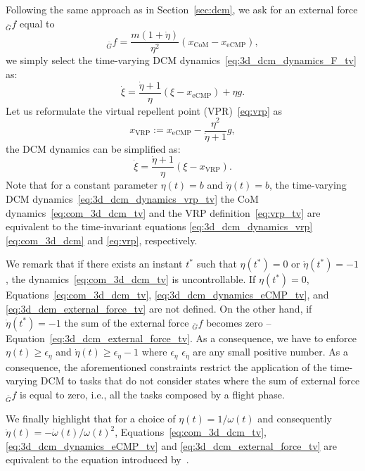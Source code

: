 Following the same approach as in Section~\ref{sec:dcm}, we ask for an external force ${}_{\bar{G}} f$ equal to
\begin{equation}
    \label{eq:3d_dcm_external_force_tv}
    {}_{\bar{G}} f = \frac{m(1 + \dot{\eta})}{\eta^2} (x_\text{CoM} - x_\text{eCMP}),
\end{equation}
we simply select the time-varying DCM dynamics~\eqref{eq:3d_dcm_dynamics_F_tv} as:
\begin{equation}
  \label{eq:3d_dcm_dynamics_eCMP_tv}
  \dot{\xi} = \frac{\dot{\eta} + 1}{\eta}( \xi - x_\text{eCMP}) +  \eta g.
\end{equation}
Let us reformulate the virtual repellent point (VPR)~\eqref{eq:vrp} as 
\begin{equation}
\label{eq:vrp_tv}
x_\text{VRP} := x_\text{eCMP} - \frac{\eta^2}{\dot{\eta} + 1} g,
\end{equation}
the DCM dynamics can be simplified as:
\begin{equation}
  \label{eq:3d_dcm_dynamics_vrp_tv}
   \dot{\xi} = \frac{\dot{\eta} + 1}{\eta}( \xi - x_\text{VRP}).
\end{equation}
Note that for a constant parameter $\eta(t) = b$ and $\dot{\eta}(t) = b$, the time-varying DCM dynamics~\eqref{eq:3d_dcm_dynamics_vrp_tv} the CoM dynamics~\eqref{eq:com_3d_dcm_tv} and the VRP definition~\eqref{eq:vrp_tv} are equivalent to the time-invariant equations \eqref{eq:3d_dcm_dynamics_vrp} \eqref{eq:com_3d_dcm} and \eqref{eq:vrp}, respectively. 
\par
We remark that if there exists an instant $t^*$ such that $\eta(t^*) = 0$ or $\dot{\eta}(t^*) = -1$, the dynamics~\eqref{eq:com_3d_dcm_tv} is uncontrollable. If $\eta(t^*) = 0$, Equations~\eqref{eq:com_3d_dcm_tv}, \eqref{eq:3d_dcm_dynamics_eCMP_tv}, and \eqref{eq:3d_dcm_external_force_tv} are not defined. On the other hand, if $\dot{\eta}(t^*) = -1$ the sum of the external force ${}_{\bar{G}} f$ becomes zero -- Equation~\eqref{eq:3d_dcm_external_force_tv}.
As a consequence, we have to enforce $\eta(t) \ge \epsilon_{\eta}$ and $\dot{\eta}(t) \ge \epsilon_{\dot{\eta}} - 1$ where $\epsilon_\eta$ $\epsilon_{\dot{\eta}}$ are any small positive number.
As a consequence, the aforementioned constraints restrict the application of the time-varying DCM to tasks that do not consider states where the sum of external force ${}_{\bar{G}} f$ is equal to zero, i.e., all the tasks composed by a flight phase.
\par
We finally highlight that for a choice of $\eta(t) = 1/\omega(t)$ and consequently $\dot{\eta}(t) = - \dot{\omega}(t)/\omega(t)^2$,  Equations~\eqref{eq:com_3d_dcm_tv}, \eqref{eq:3d_dcm_dynamics_eCMP_tv} and \eqref{eq:3d_dcm_external_force_tv} are equivalent to the equation introduced by~\cite{Hopkins2015}.
